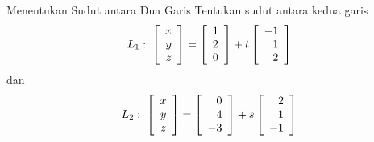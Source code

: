 \begin{example}{Menentukan Sudut antara Dua Garis}\label{exa:anglebetweentwolines}
Tentukan sudut antara kedua garis
\begin{equation*}
L_1:  \;
\left[
\begin{array}{r}
x \\
y \\
z
\end{array}
\right]
 =
\left[
\begin{array}{r}
1 \\
2 \\
0
\end{array}
\right] +t\left[
\begin{array}{r}
-1 \\
1 \\
2
\end{array}
\right]
\end{equation*}
dan
\begin{equation*}
L_2: \;
\left[
\begin{array}{r}
x \\
y \\
z
\end{array}
\right]
 =
\left[
\begin{array}{r}
0 \\
4 \\
-3
\end{array}
\right]
 +s\left[
\begin{array}{r}
2 \\
1 \\
-1
\end{array}
\right]
\end{equation*}
\end{example}

